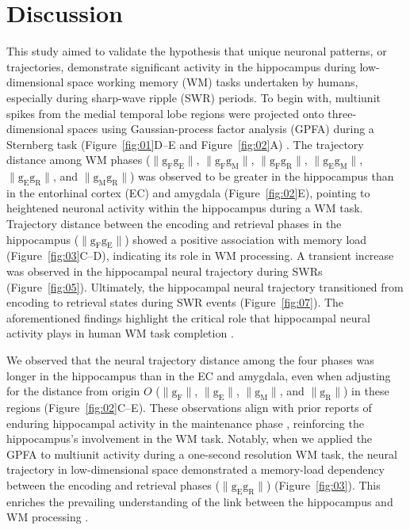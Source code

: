 \section{Discussion}
This study aimed to validate the hypothesis that unique neuronal patterns, or trajectories, demonstrate significant activity in the hippocampus during low-dimensional space working memory (WM) tasks undertaken by humans, especially during sharp-wave ripple (SWR) periods. To begin with, multiunit spikes from the medial temporal lobe regions were projected onto three-dimensional spaces using Gaussian-process factor analysis (GPFA) during a Sternberg task (Figure~\ref{fig:01}D--E and Figure~\ref{fig:02}A) \cite{yu_gaussian-process_2009}. The trajectory distance among WM phases ($\mathrm{\lVert g_{F}g_{E} \rVert}$, $\mathrm{\lVert g_{F}g_{M} \rVert}$, $\mathrm{\lVert g_{F}g_{R} \rVert}$, $\mathrm{\lVert g_{E}g_{M} \rVert}$, $\mathrm{\lVert g_{E}g_{R} \rVert}$, and $\mathrm{\lVert g_{M}g_{R} \rVert}$) was observed to be greater in the hippocampus than in the entorhinal cortex (EC) and amygdala (Figure~\ref{fig:02}E), pointing to heightened neuronal activity within the hippocampus during a WM task. Trajectory distance between the encoding and retrieval phases in the hippocampus ($\mathrm{\lVert g_{F}g_{E} \rVert}$) showed a positive association with memory load (Figure~\ref{fig:03}C--D), indicating its role in WM processing. A transient increase was observed in the hippocampal neural trajectory during SWRs (Figure~\ref{fig:05}). Ultimately, the hippocampal neural trajectory transitioned from encoding to retrieval states during SWR events (Figure~\ref{fig:07}). The aforementioned findings highlight the critical role that hippocampal neural activity plays in human WM task completion \cite{naber_reciprocal_2001,van_strien_anatomy_2009,strange_functional_2014}.

We observed that the neural trajectory distance among the four phases was longer in the hippocampus than in the EC and amygdala, even when adjusting for the distance from origin $O$ ($\mathrm{\lVert g_{F} \rVert}$, $\mathrm{\lVert g_{E} \rVert}$, $\mathrm{\lVert g_{M} \rVert}$, and $\mathrm{\lVert g_{R} \rVert}$) in these regions (Figure~\ref{fig:02}C--E). These observations align with prior reports of enduring hippocampal activity in the maintenance phase \cite{boran_persistent_2019,kaminski_persistently_2017,kornblith_persistent_2017,faraut_dataset_2018}, reinforcing the hippocampus's involvement in the WM task. Notably, when we applied the GPFA to multiunit activity during a one-second resolution WM task, the neural trajectory in low-dimensional space demonstrated a memory-load dependency between the encoding and retrieval phases ($\mathrm{\lVert g_{E}g_{R} \rVert}$) (Figure~\ref{fig:03}). This enriches the prevailing understanding of the link between the hippocampus and WM processing \cite{oso_boran_2020}.

